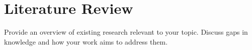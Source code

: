 \chapter{Literature Review}
\label{ch:literature_review}
Provide an overview of existing research relevant to your topic. Discuss gaps in knowledge and how your work aims to address them.
